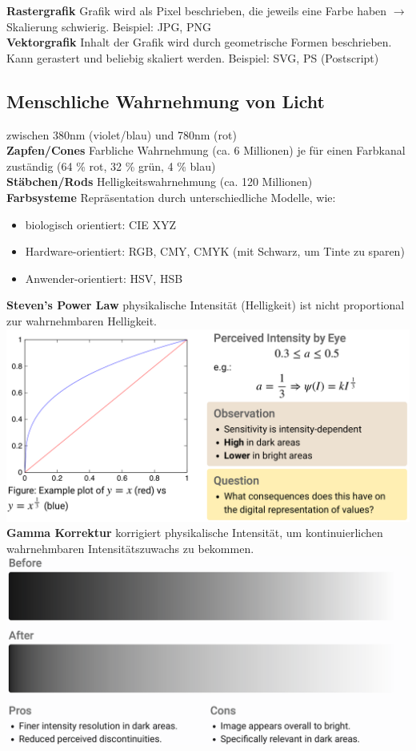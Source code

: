 \documentclass[12pt]{article}
\begin{document}
	\textbf{Rastergrafik} Grafik wird als Pixel beschrieben, die jeweils eine Farbe haben $\rightarrow$ Skalierung schwierig. Beispiel: JPG, PNG\\
	\textbf{Vektorgrafik} Inhalt der Grafik wird durch geometrische Formen beschrieben. Kann gerastert und beliebig skaliert werden. Beispiel: SVG, PS (Postscript)\\


	\subsection{Menschliche Wahrnehmung von Licht}
	zwischen 380nm (violet/blau) und 780nm (rot)\\
	\textbf{Zapfen/Cones} Farbliche Wahrnehmung (ca. 6 Millionen) je für einen Farbkanal zuständig (64 \% rot, 32 \% grün, 4 \% blau)\\
	\textbf{Stäbchen/Rods} Helligkeitswahrnehmung (ca. 120 Millionen)\\
	\textbf{Farbsysteme} Repräsentation durch unterschiedliche Modelle, wie:
	\begin{itemize}
		\item biologisch orientiert: CIE XYZ
		\item Hardware-orientiert: RGB, CMY, CMYK (mit Schwarz, um Tinte zu sparen)
		\item Anwender-orientiert: HSV, HSB
	\end{itemize}
	\textbf{Steven's Power Law} physikalische Intensität (Helligkeit) ist nicht proportional zur wahrnehmbaren Helligkeit.\\
	\includegraphics[width=\linewidth]{figures/stevens-law.png}\\
	\textbf{Gamma Korrektur} korrigiert physikalische Intensität, um kontinuierlichen wahrnehmbaren Intensitätszuwachs zu bekommen.\\
	\includegraphics[width=\linewidth]{figures/gamma-correction.png}
\end{document}
